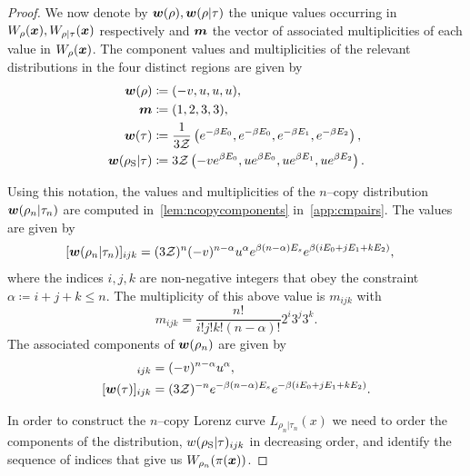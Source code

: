 \begin{proof}
We now denote by $\boldsymbol{w}(\rho), \boldsymbol{w}(\rho|\tau)$ the unique values occurring in $W_\rho(\boldsymbol{x}), W_{\rho|\tau}(\boldsymbol{x})$ respectively and $\bm{m}$ the vector of associated multiplicities of each value in $W_\rho(\boldsymbol{x})$. The component values and multiplicities of the relevant distributions in the four distinct regions are given by
\begin{align}
	\boldsymbol{w}(\rho) &\coloneqq (-v, u, u, u), \\
		\bm{m} &\coloneqq (1,2,3,3), \\
	\bm{w}(\tau) &\coloneqq \frac{1}{3\mathcal{Z}} \left( e^{-\beta E_0}, e^{-\beta E_0}, e^{-\beta E_1}, e^{-\beta E_2} \right), \\
	\bm{w}(\rho_{\rm{S}} | \tau) &\coloneqq 3\mathcal{Z} \left( -v e^{\beta E_0}, u e^{\beta E_0}, u e^{\beta E_1}, u e^{\beta E_2} \right). \label{eq:bmw_rescaled}
\end{align}

Using this notation, the values and multiplicities of the $n$--copy distribution $\bm{w}(\rho_n |\tau_n)$ are computed in~\cref{lem:ncopycomponents} in~\cref{app:cmpairs}. The values are given by 
\begin{align}\label{eq:ncopy_w_rescaled}
	[\boldsymbol{w}(\rho_n | \tau_n)]_{ijk} &= (3\mathcal{Z})^{n} (-v)^{n-\alpha} u^{\alpha} e^{\beta (n-\alpha)E_s} e^{\beta ( i E_0 + j E_1 + k E_2 )},
\end{align}
where the indices $i,j,k$ are non-negative integers that obey the constraint $\alpha \coloneqq i+j+k \leq n$.
The multiplicity of this above value is $m_{ijk}$ with
\begin{equation}
	m_{ijk} = \frac{n!}{i!j!k!(n-\alpha)!} 2^i 3^j 3^k.
\end{equation}
The associated components of $\boldsymbol{w}(\rho_n)$ are given by
\begin{align}
	[\w(\rho_n)]_{ijk} &= (-v)^{n-\alpha} u^{\alpha}, \label{eq:ncopy_wrho}\\
	[\w(\tau)]_{ijk} &= (3\Z)^{-n} e^{-\beta (n-\alpha)E_s} e^{-\beta ( i E_0 + j E_1 + k E_2 )}. \label{eq:ncopy_wsigma}
\end{align}

In order to construct the $n$--copy Lorenz curve $L_{\rho_n|\tau_n}(x)$ we need to order the components of the distribution, $w(\rho_{\rm{S}} | \tau)_{ijk}$ in decreasing order, and identify the sequence of indices that give us $W_{\rho_n}(\pi(\boldsymbol{x}))$.


\end{proof}
